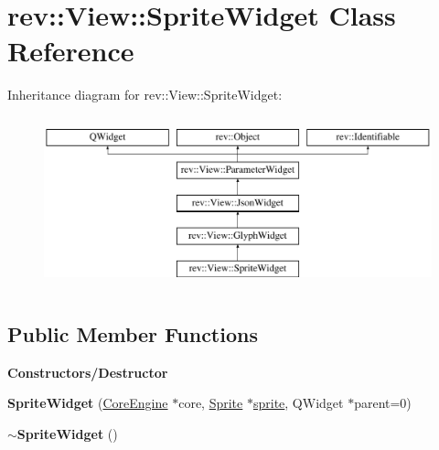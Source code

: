 \hypertarget{classrev_1_1_view_1_1_sprite_widget}{}\section{rev\+::View\+::Sprite\+Widget Class Reference}
\label{classrev_1_1_view_1_1_sprite_widget}
Inheritance diagram for rev\+::View\+::Sprite\+Widget\+:\begin{figure}[H]
\begin{center}
\leavevmode
\includegraphics[height=5.000000cm]{classrev_1_1_view_1_1_sprite_widget}
\end{center}
\end{figure}
\subsection*{Public Member Functions}
\begin{Indent}\textbf{ Constructors/\+Destructor}\par
\begin{DoxyCompactItemize}
\item 
\mbox{\label{classrev_1_1_view_1_1_sprite_widget_a25a58311f23b7afcecb26748831186a5}} 
{\bfseries Sprite\+Widget} (\mbox{\hyperlink{classrev_1_1_core_engine}{Core\+Engine}} $\ast$core, \mbox{\hyperlink{classrev_1_1_sprite}{Sprite}} $\ast$\mbox{\hyperlink{classrev_1_1_view_1_1_sprite_widget_af238328cac6bc8c54ed7e17ae4c46d7c}{sprite}}, Q\+Widget $\ast$parent=0)
\item 
\mbox{\label{classrev_1_1_view_1_1_sprite_widget_a88dbdff6e835f75ff11b992e6d2688fb}} 
{\bfseries $\sim$\+Sprite\+Widget} ()
\end{DoxyCompactItemize}
\end{Indent}
